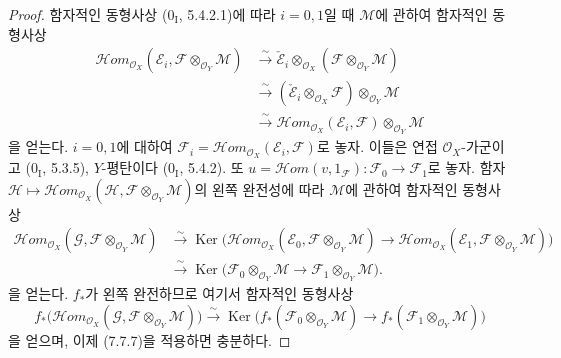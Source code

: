 \begin{proof}
함자적인 동형사상 ($0_{\mathrm I}$, 5.4.2.1)에 따라 $i=0,1$일 때
$\mathscr M$에 관하여 함자적인 동형사상
\begin{align*}
  \mathscr{H}\!om_{\mathscr O_X}
    (\mathscr E_i,\mathscr F\otimes_{\mathscr O_Y}\mathscr M)
  &\xrightarrow{\sim}
  \check{\mathscr E}_i
    \otimes_{\mathscr O_X}
    (\mathscr F\otimes_{\mathscr O_Y}\mathscr M)\\
  &\xrightarrow{\sim}
  (\check{\mathscr E}_i\otimes_{\mathscr O_X}\mathscr F)
    \otimes_{\mathscr O_Y}\mathscr M\\
  &\xrightarrow{\sim}
  \mathscr{H}\!om_{\mathscr O_X}(\mathscr E_i,\mathscr F)
    \otimes_{\mathscr O_Y}\mathscr M
\end{align*}
을 얻는다. $i=0,1$에 대하여
$\mathscr F_i=\mathscr{H}\!om_{\mathscr O_X}(\mathscr E_i,\mathscr F)$로
놓자. 이들은 연접 $\mathscr O_X$-가군이고 ($0_{\mathrm I}$, 5.3.5),
$Y$-평탄이다 ($0_{\mathrm I}$, 5.4.2). 또
$u=\mathscr{H}\!om(v,1_{\mathscr F}):\mathscr F_0\to\mathscr F_1$로 놓자.
함자
$\mathscr H\mapsto\mathscr{H}\!om_{\mathscr O_X}
(\mathscr H,\mathscr F\otimes_{\mathscr O_Y}\mathscr M)$의 왼쪽 완전성에
따라 $\mathscr M$에 관하여 함자적인 동형사상
\begin{align*}
  \mathscr{H}\!om_{\mathscr O_X}
    (\mathscr G,\mathscr F\otimes_{\mathscr O_Y}\mathscr M)
  &\xrightarrow{\sim}
  \operatorname{Ker}
  \bigl(
    \mathscr{H}\!om_{\mathscr O_X}
      (\mathscr E_0,\mathscr F\otimes_{\mathscr O_Y}\mathscr M)
    \longrightarrow
    \mathscr{H}\!om_{\mathscr O_X}
      (\mathscr E_1,\mathscr F\otimes_{\mathscr O_Y}\mathscr M)
  \bigr)\\
  &\xrightarrow{\sim}
  \operatorname{Ker}
  \bigl(
    \mathscr F_0\otimes_{\mathscr O_Y}\mathscr M
    \longrightarrow
    \mathscr F_1\otimes_{\mathscr O_Y}\mathscr M
  \bigr).
\end{align*}
을 얻는다. $f_*$가 왼쪽 완전하므로 여기서 함자적인 동형사상
\[
  f_*
  \bigl(
    \mathscr{H}\!om_{\mathscr O_X}
      (\mathscr G,\mathscr F\otimes_{\mathscr O_Y}\mathscr M)
  \bigr)
  \xrightarrow{\sim}
  \operatorname{Ker}
  \bigl(
    f_*(\mathscr F_0\otimes_{\mathscr O_Y}\mathscr M)
    \longrightarrow
    f_*(\mathscr F_1\otimes_{\mathscr O_Y}\mathscr M)
  \bigr)
\]
을 얻으며, 이제 (7.7.7)을 적용하면 충분하다.
\end{proof}


